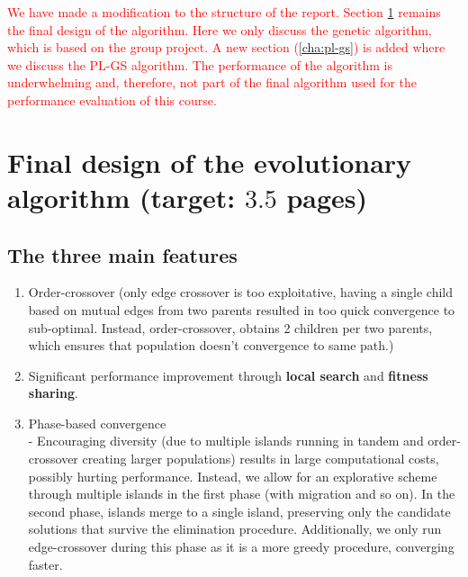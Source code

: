 \documentclass[a4paper,10pt]{article}
\def\retake{0}
\newcommand{\switch}[2]{\ifnum\retake=0{#1}\else{#2}\fi}
\newcommand{\ReplaceMe}[1]{{\color{blue}#1}}
\newcommand{\RemoveMe}[1]{{\color{purple}#1}}
\begin{document}
	\textcolor{red}{
		We have made a modification to the structure of the report. Section \ref{cha:final_design} remains the final design of the algorithm. Here we only discuss the genetic algorithm, which is based on the group project. A new section (\ref{cha:pl-gs}) is added where we discuss the PL-GS algorithm. The performance of the algorithm is underwhelming and, therefore, not part of the final algorithm used for the performance evaluation of this course.
	}


\section{Final design of the evolutionary algorithm (target: $3.5$ pages)} \label{cha:final_design}


\subsection{The three main features}

	\begin{enumerate}
	\item Order-crossover (only edge crossover is too exploitative, having a single child based on mutual edges from two parents resulted in too quick convergence to sub-optimal. Instead, order-crossover, obtains 2 children per two parents, which ensures that population doesn't convergence to same path.)
	\item Significant performance improvement through \textbf{local search} and \textbf{fitness sharing}.
	\item Phase-based convergence \\
		- Encouraging diversity (due to multiple islands running in tandem and order-crossover creating larger populations) results in large computational costs, possibly hurting performance. Instead, we allow for an explorative scheme through multiple islands in the first phase (with migration and so on). In the second phase, islands merge to a single island, preserving only the candidate solutions that survive the elimination procedure. Additionally, we only run edge-crossover during this phase as it is a more greedy procedure, converging faster.
	\end{enumerate}
	
\end{document}
